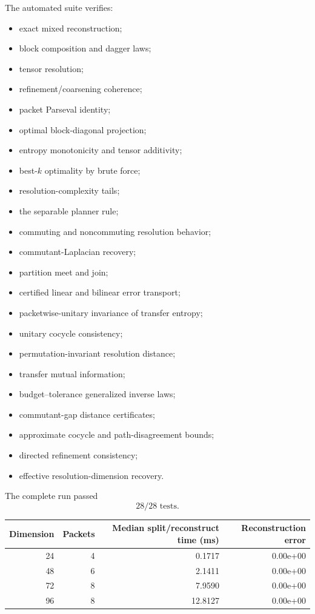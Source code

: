 \documentclass[11pt]{article}
\theoremstyle{definition}
\theoremstyle{remark}
\begin{document}
The automated suite verifies:
\begin{itemize}
\item exact mixed reconstruction;
\item block composition and dagger laws;
\item tensor resolution;
\item refinement/coarsening coherence;
\item packet Parseval identity;
\item optimal block-diagonal projection;
\item entropy monotonicity and tensor additivity;
\item best-\(k\) optimality by brute force;
\item resolution-complexity tails;
\item the separable planner rule;
\item commuting and noncommuting resolution behavior;
\item commutant-Laplacian recovery;
\item partition meet and join;
\item certified linear and bilinear error transport;
\item packetwise-unitary invariance of transfer entropy;
\item unitary cocycle consistency;
\item permutation-invariant resolution distance;
\item transfer mutual information;
\item budget--tolerance generalized inverse laws;
\item commutant-gap distance certificates;
\item approximate cocycle and path-disagreement bounds;
\item directed refinement consistency;
\item effective resolution-dimension recovery.
\end{itemize}

The complete run passed
\[
\boxed{28/28\text{ tests}}.
\]

\begin{center}
\small
\begin{tabular}{rrrr}
\toprule
Dimension & Packets & Median split/reconstruct time (ms) & Reconstruction error\\
\midrule
24 & 4 & 0.1717 & 0.00e+00 \\
48 & 6 & 2.1411 & 0.00e+00 \\
72 & 8 & 7.9590 & 0.00e+00 \\
96 & 8 & 12.8127 & 0.00e+00 \\
\bottomrule
\end{tabular}
\end{center}
\end{document}
